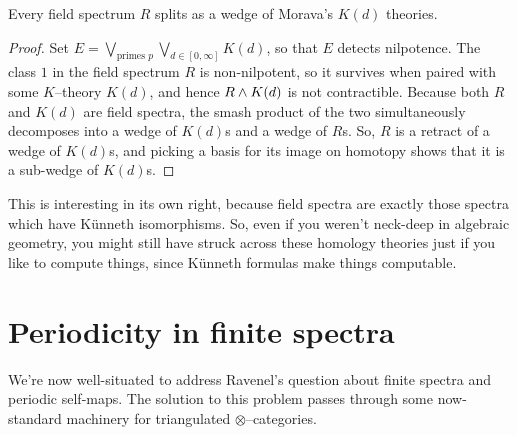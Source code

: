 \begin{corollary}\label{FieldSpectraAreKTheories}
Every field spectrum $R$ splits as a wedge of Morava's $K(d)$ theories.
\end{corollary}
\begin{proof}
Set $E = \bigvee_{\text{primes $p$}} \bigvee_{d \in [0, \infty]} K(d)$, so that $E$ detects nilpotence.  The class $1$ in the field spectrum $R$ is non-nilpotent, so it survives when paired with some $K$--theory $K(d)$, and hence $R \wedge K(d)$ is not contractible.  Because both $R$ and $K(d)$ are field spectra, the smash product of the two simultaneously decomposes into a wedge of $K(d)$s and a wedge of $R$s.  So, $R$ is a retract of a wedge of $K(d)$s, and picking a basis for its image on homotopy shows that it is a sub-wedge of $K(d)$s.
\end{proof}

\begin{remark}
This is interesting in its own right, because field spectra are exactly those spectra which have K\"unneth isomorphisms.  So, even if you weren't neck-deep in algebraic geometry, you might still have struck across these homology theories just if you like to compute things, since K\"unneth formulas make things computable.
\end{remark}







\section{Periodicity in finite spectra}

We're now well-situated to address Ravenel's question about finite spectra and periodic self-maps.  The solution to this problem passes through some now-standard machinery for triangulated $\otimes$--categories. 

